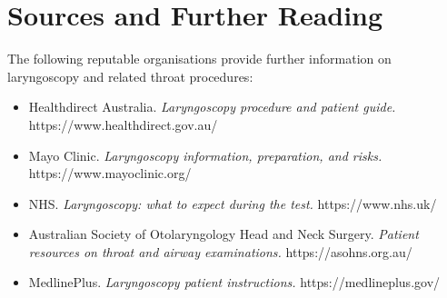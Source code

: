 \section*{Sources and Further Reading}
The following reputable organisations provide further information on laryngoscopy and related throat procedures:
\begin{itemize}
    \item Healthdirect Australia. \textit{Laryngoscopy procedure and patient guide.} https://www.healthdirect.gov.au/
    \item Mayo Clinic. \textit{Laryngoscopy information, preparation, and risks.} https://www.mayoclinic.org/
    \item NHS. \textit{Laryngoscopy: what to expect during the test.} https://www.nhs.uk/
    \item Australian Society of Otolaryngology Head and Neck Surgery. \textit{Patient resources on throat and airway examinations.} https://asohns.org.au/
    \item MedlinePlus. \textit{Laryngoscopy patient instructions.} https://medlineplus.gov/
\end{itemize}
